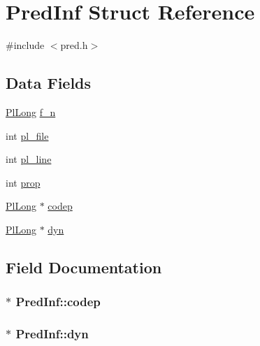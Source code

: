 \hypertarget{structPredInf}{}\section{Pred\+Inf Struct Reference}
\label{structPredInf}


{\ttfamily \#include $<$pred.\+h$>$}

\subsection*{Data Fields}
\begin{DoxyCompactItemize}
\item 
\hyperlink{gprolog_8h_a4d005b136d7fb28537eb1815f7868b63}{Pl\+Long} \hyperlink{structPredInf_ac0b2b557f702cda0d5111bc65630d5a3}{f\+\_\+n}
\item 
int \hyperlink{structPredInf_a0d5ac69f7fce6062b3327fc2badc1658}{pl\+\_\+file}
\item 
int \hyperlink{structPredInf_a206ac901da36832f6111a542a2b8b11b}{pl\+\_\+line}
\item 
int \hyperlink{structPredInf_a2f0d287390fe634467a62f42f816d855}{prop}
\item 
\hyperlink{gprolog_8h_a4d005b136d7fb28537eb1815f7868b63}{Pl\+Long} $\ast$ \hyperlink{structPredInf_a670788fe731440a8d7224e2729836dac}{codep}
\item 
\hyperlink{gprolog_8h_a4d005b136d7fb28537eb1815f7868b63}{Pl\+Long} $\ast$ \hyperlink{structPredInf_aad15bc35f98eabb92f4ac4b9a35f65c0}{dyn}
\end{DoxyCompactItemize}


\subsection{Field Documentation}
\subsubsection[{\texorpdfstring{codep}{codep}}]{$\ast$ Pred\+Inf\+::codep}\hypertarget{structPredInf_a670788fe731440a8d7224e2729836dac}{}\label{structPredInf_a670788fe731440a8d7224e2729836dac}
\subsubsection[{\texorpdfstring{dyn}{dyn}}]{$\ast$ Pred\+Inf\+::dyn}\hypertarget{structPredInf_aad15bc35f98eabb92f4ac4b9a35f65c0}{}\label{structPredInf_aad15bc35f98eabb92f4ac4b9a35f65c0}
